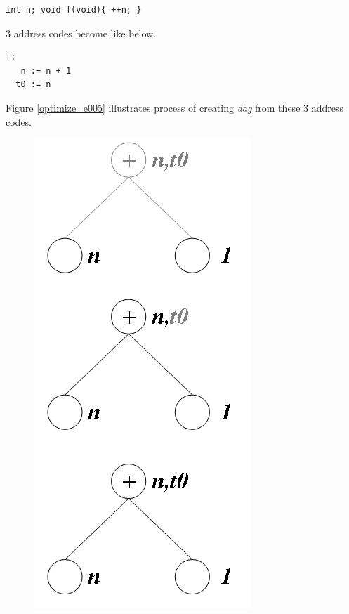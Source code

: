 \begin{Example}
\label{optimize_e006}
\begin{verbatim}
int n; void f(void){ ++n; }
\end{verbatim}
3 address codes become like below.
\begin{verbatim}
f:
   n := n + 1
  t0 := n
\end{verbatim}
Figure \ref{optimize_e005} illustrates
process of creating {\em dag} from these 3 address codes.
\begin{figure}[htbp]
\begin{center}
\begin{htmlonly}
\includegraphics[width=0.5\linewidth,height=1.01\linewidth]{opt000.png}
\end{htmlonly}
\begin{latexonly}

\end{latexonly}
\end{center}
\end{figure}
\end{Example}
